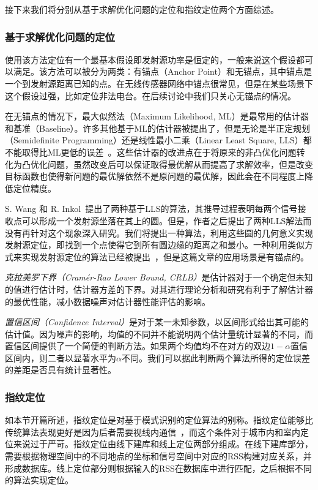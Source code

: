 接下来我们将分别从基于求解优化问题的定位和指纹定位两个方面综述。

\subsubsection{基于求解优化问题的定位}

使用该方法定位有一个最基本假设即发射源功率是恒定的，一般来说这个假设都可以满足。该方法可以被分为两类：有锚点（Anchor Point）和无锚点，其中锚点是一个到发射源距离已知的点。在无线传感器网络中锚点很常见，但是在某些场景下这个假设过强，比如定位非法电台。在后续讨论中我们只关心无锚点的情况。

在无锚点的情况下，最大似然法（Maximum Likelihood, ML）是最常用的估计器和基准（Baseline）。许多其他基于ML的估计器被提出了，但是无论是半正定规划（Semidefinite Programming）还是线性最小二乘（Linear Least Square, LLS）都不能取得比ML更低的误差~\cite{jackson2011received}。这些估计器的改进点在于将原来的非凸优化问题转化为凸优化问题，虽然改变后可以保证取得最优解从而提高了求解效率，但是改变目标函数也使得新问题的最优解依然不是原问题的最优解，因此会在不同程度上降低定位精度。

S. Wang 和 R. Inkol~\cite{wang2011near}提出了两种基于LLS的算法，其推导过程表明每两个信号接收点可以形成一个发射源坐落在其上的圆。但是，作者之后提出了两种LLS解法而没有再针对这个现象深入研究。我们将提出一种算法，利用这些圆的几何意义实现发射源定位，即找到一个点使得它到所有圆边缘的距离之和最小。一种利用类似方式来实现发射源定位的算法已经被提出~\cite{liu2006analysis}，但是这篇文章的应用场景是有锚点的。

\textit{克拉美罗下界（Cram\'{e}r-Rao Lower Bound, CRLB）}是估计器对于一个确定但未知的值进行估计时，估计器方差的下界。对其进行理论分析和研究有利于了解估计器的最优性能，减小数据噪声对估计器性能评估的影响。

\textit{置信区间（Confidence Interval）}是对于某一未知参数，以区间形式给出其可能的估计值。因为噪声的影响，均值的不同并不能说明两个估计量统计显著的不同，而置信区间提供了一个简便的判断方法。如果两个均值均不在对方的双边$1-\alpha$置信区间内，则二者以显著水平为$\alpha$不同。我们可以据此判断两个算法所得的定位误差的差距是否具有统计显著性。

\subsubsection{指纹定位}

如本节开篇所述，指纹定位是对基于模式识别的定位算法的别称。指纹定位能够比传统算法表现更好是因为后者需要视线内通信~\cite{gentile2012geolocation}，而这个条件对于城市内和室内定位来说过于严苛。指纹定位由线下建库和线上定位两部分组成。在线下建库部分，需要根据物理空间中的不同地点的坐标和信号空间中对应的RSS构建对应关系，并形成数据库。线上定位部分则根据输入的RSS在数据库中进行匹配，之后根据不同的算法实现定位。

